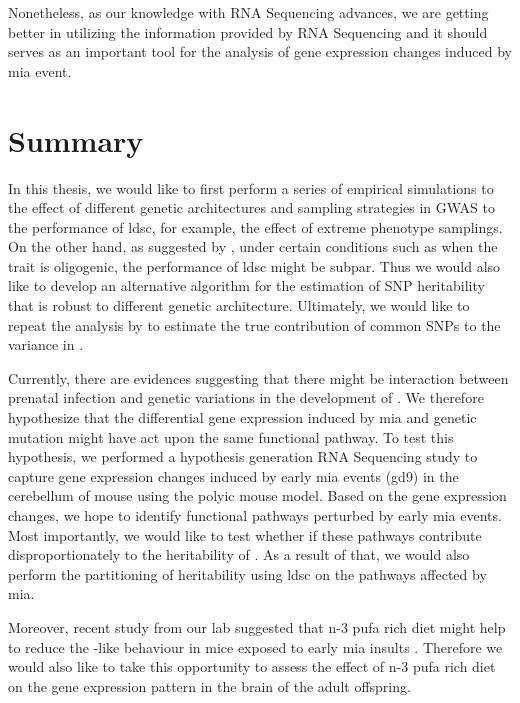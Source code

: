 \documentclass[12pt]{scrbook}
\newcommand*{\glng}{\glsentrylong}
\begin{document}
	Nonetheless, as our knowledge with RNA Sequencing advances, we are getting better in utilizing the information provided by RNA Sequencing and it should serves as an important tool for the analysis of gene expression changes induced by \gls{mia} event.
	
	\section{Summary}
	In this thesis, we would like to first perform a series of empirical simulations to the effect of different genetic architectures and sampling strategies in \gls{GWAS} to the performance of \gls{ldsc}, for example, the effect of extreme phenotype samplings.
	On the other hand, as suggested by \citet{Bulik-Sullivan2015}, under certain conditions such as when the trait is oligogenic, the performance of \gls{ldsc} might be subpar. 
	Thus we would also like to develop an alternative algorithm for the estimation of \gls{SNP} heritability that is robust to different genetic architecture.
	Ultimately, we would like to repeat the analysis by \citet{Bulik-Sullivan2015} to estimate the true contribution of common \glspl{SNP} to the variance in \glng{scz}.
	
	Currently, there are evidences suggesting that there might be interaction between prenatal infection and genetic variations in the development of \glng{scz} \citep{Tienari2004,Clarke2009}.
	We therefore hypothesize that the differential gene expression induced by \gls{mia} and genetic mutation might have act upon the same functional pathway.
	To test this hypothesis, we performed a hypothesis generation RNA Sequencing study to capture gene expression changes induced by early \gls{mia} events (\gls{gd}9) in the cerebellum of mouse using the \gls{polyic} mouse model.
	Based on the gene expression changes, we hope to identify functional pathways perturbed by early \gls{mia} events.
	Most importantly, we would like to test whether if these pathways contribute disproportionately to the heritability of \glng{scz}.
	As a result of that, we would also perform the partitioning of heritability using \gls{ldsc} on the pathways affected by \gls{mia}.
	
	Moreover, recent study from our lab suggested that n-3 \gls{pufa} rich diet might help to reduce the \glng{scz}-like behaviour in mice exposed to early \gls{mia} insults \citep{Li2015}. 
	Therefore we would also like to take this opportunity to assess the effect of n-3 \gls{pufa} rich diet on the gene expression pattern in the brain of the adult offspring.
	
\end{document}
